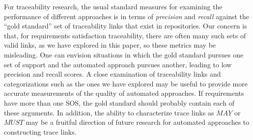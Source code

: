 For traceability research, the usual standard measures for examining the performance of different approaches is in terms of {\em precision} and {\em recall} against the ``gold standard'' set of traceability links that exist in repositories.  Our concern is that, for requirements satisfaction traceability, there are often many such sets of valid links, as we have explored in this paper, so these metrics may be misleading.  One can envision situations in which the gold standard pursues one set of support and the automated approach pursues another, leading to low precision and recall scores.  A close examination of traceability links and categorizations such as the ones we have explored may be useful to provide more accurate measurements of the quality of automated approaches.  If requirements have more than one SOS, the gold standard should probably contain each of these arguments.  In addition, the ability to characterize trace links as $MAY$ or $MUST$ may be a fruitful direction of future research for automated approaches to constructing trace links.





